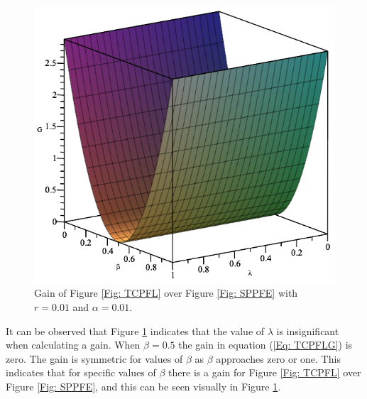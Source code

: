 \documentclass[twocolumn]{article}
\begin{document}
\begin{figure}[ht]
    \centering
    \includegraphics[scale=0.35]{Phase-Flip-Triple-Channel-r=001-Alpha=001-Gain-Graph.png}
    \caption{\footnotesize{Gain of Figure \ref{Fig: TCPFL} over Figure \ref{Fig: SPPFE} with $r=0.01$ and $\alpha=0.01$.}}
    \label{Fig: TCPFLGA}
\end{figure}
\par \noindent 
It can be observed that Figure \ref{Fig: TCPFLGA} indicates that the value of $\lambda$ is insignificant when calculating a gain. When $\beta=0.5$ the gain in equation (\ref{Eq: TCPFLG}) is zero. The gain is symmetric for values of $\beta$ as $\beta$ approaches zero or one. This indicates that for specific values of $\beta$ there is a gain for Figure \ref{Fig: TCPFL} over Figure \ref{Fig: SPPFE}, and this can be seen visually in Figure \ref{Fig: TCPFLGA}.
\end{document}
